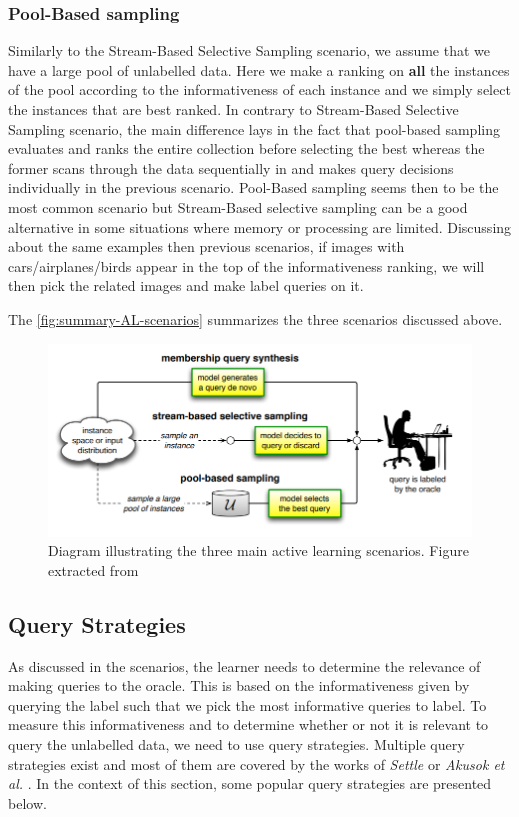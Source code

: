 \documentclass[11pt, openany]{report}
\theoremstyle{plain}
\theoremstyle{definition}
\theoremstyle{remark}
\begin{document}
\subsubsection{Pool-Based sampling}
Similarly to the Stream-Based Selective Sampling scenario, we assume that we have a large pool of unlabelled data. Here we make a ranking on \textbf{all} the instances of the pool according to the informativeness of each instance and we simply select the instances that are best ranked. In contrary to Stream-Based Selective Sampling scenario, the main difference lays in the fact that pool-based sampling evaluates and ranks the entire collection before selecting the best whereas the former scans through the data sequentially in and makes query decisions individually \cite{AL-Survey} in the previous scenario. Pool-Based sampling seems then to be the most common scenario but Stream-Based selective sampling can be a good alternative in some situations where memory or processing are limited. Discussing about the same examples then previous scenarios, if images with cars/airplanes/birds appear in the top of the informativeness ranking, we will then pick the related images and make label queries on it. 

The \autoref{fig:summary-AL-scenarios} summarizes the three scenarios discussed above. 

\begin{figure}[H]
  \centering
  \includegraphics[scale=0.55]{figures/summary-AL-scenarios.png}
  \caption{Diagram illustrating the three main active learning scenarios. Figure extracted from \cite{AL-Survey}}
  \label{fig:summary-AL-scenarios}
\end{figure}

\subsection{Query Strategies} \label{sec:AL-queries}
As discussed in the scenarios, the learner needs to determine the relevance of making queries to the oracle. This is based on the informativeness given by querying the label such that we pick the most informative queries to label. To measure this informativeness and to determine whether or not it is relevant to query the unlabelled data, we need to use query strategies. Multiple query strategies exist and most of them are covered by the works of \textit{Settle} \cite{AL-Survey} or \textit{Akusok et al.} \cite{AL-queries-2}. In the context of this section, some popular query strategies are presented below.
\end{document}
